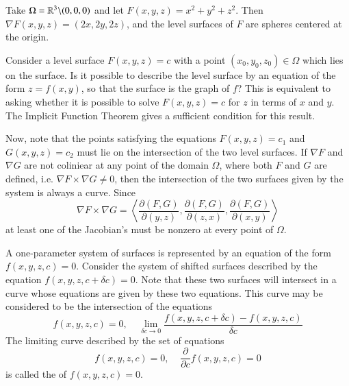 \documentclass[12pt, a4paper, oneside, openright, titlepage]{book}
\begin{document}
\begin{appendices}
    \begin{eg}
        Take $\Omega = \mathbb R^3\backslash (0,0,0)$ and let $F(x,y,z) = x^2+y^2+z^2$. Then $\nabla F(x,y,z) = (2x,2y,2z)$, and the level surfaces of $F$ are spheres centered at the origin.
    \end{eg}


    Consider a level surface $F(x,y,z) = c$ with a point $(x_0,y_0,z_0) \in \Omega$ which lies on the surface. Is it possible to describe the level surface by an equation of the form $z = f(x,y)$, so that the surface is the graph of $f$? This is equivalent to asking whether it is possible to solve $F(x,y,z) = c$ for $z$ in terms of $x$ and $y$. The Implicit Function Theorem gives a sufficient condition for this result.

    Now, note that the points satisfying the equations $F(x,y,z) = c_1$ and $G(x,y,z) = c_2$ must lie on the intersection of the two level surfaces. If $\nabla F$ and $\nabla G$ are not coliniear at any point of the domain $\Omega$, where both $F$ and $G$ are defined, i.e. $\nabla F\times \nabla G \neq 0$, then the intersection of the two surfaces given by the system is always a curve. Since \begin{equation*}
        \nabla F\times \nabla G = \left\langle \frac{\partial(F,G)}{\partial(y,z)}, \frac{\partial(F,G)}{\partial(z,x)},\frac{\partial(F,G)}{\partial(x,y)}\right\rangle
    \end{equation*}
    at least one of the Jacobian's must be nonzero at every point of $\Omega$.

    \begin{defn}
        A one-parameter system of surfaces is represented by an equation of the form $f(x,y,z,c) = 0$. Consider the system of shifted surfaces described by the equation $f(x,y,z,c+\delta c) = 0$. Note that these two surfaces will intersect in a curve whose equations are given by these two equations. This curve may be considered to be the intersection of the equations \begin{equation*}
            f(x,y,z,c) = 0,\;\;\;\;\lim\limits_{\delta c\rightarrow 0}\frac{f(x,y,z,c+\delta c)-f(x,y,z,c)}{\delta c}
        \end{equation*}
        The limiting curve described by the set of equations \begin{equation*}
            f(x,y,z,c) = 0,\;\;\;\;\frac{\partial}{\partial c}f(x,y,z,c) = 0
        \end{equation*}
        is called the  of $f(x,y,z,c) = 0$.
    \end{defn}


\end{appendices}
\end{document}
